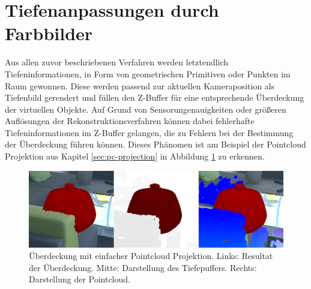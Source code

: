 \section{Tiefenanpassungen durch Farbbilder}

Aus allen zuvor beschriebenen Verfahren werden letztendlich Tiefeninformationen, in Form von geometrischen Primitiven oder Punkten im Raum gewonnen. Diese werden passend zur aktuellen Kameraposition als Tiefenbild gerendert und füllen den Z-Buffer für eine entsprechende Überdeckung der virtuellen Objekte. Auf Grund von Sensorungenauigkeiten oder größeren Auflösungen der Rekonstruktionsverfahren können dabei fehlerhafte Tiefeninformationen im Z-Buffer gelangen, die zu Fehlern bei der Bestimmung der Überdeckung führen können. Dieses Phänomen ist am Beispiel der Pointcloud Projektion aus Kapitel \ref{sec:pc-projection} in Abbildung \ref{fig:pc-noise} zu erkennen. \\

\begin{figure}[h]
  \centering
	\includegraphics[width=1.0\textwidth]{content/images/methods/pc-noise.png} 
  \caption{Überdeckung mit einfacher Pointcloud Projektion. Links: Resultat der Überdeckung. Mitte: Darstellung des Tiefepuffers. Rechts: Darstellung der Pointcloud.}
  \label{fig:pc-noise}
\end{figure}


